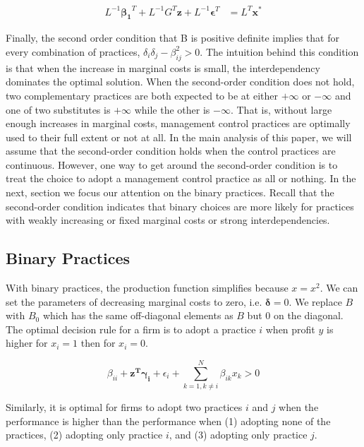 \documentclass[12pt]{article}
\begin{document}
\begin{equation} \label{eq:cholesky}
\begin{aligned} 
    L^{-1} \mathbf{\beta_1}^T + L^{-1} G^T \mathbf{z} + L^{-1} \mathbf{\epsilon}^T & = L^T \mathbf{x^*} 
\end{aligned}
\end{equation}

Finally, the second order condition that B is positive definite implies that for every combination of practices, $\delta_i \delta_j - \beta_{ij}^2 > 0$. The intuition behind this condition is that when the increase in marginal costs is small, the interdependency dominates the optimal solution. When the second-order condition does not hold, two complementary practices are both expected to be at either \(+\infty\) or \(-\infty\) and one of two substitutes is \(+\infty\) while the other is \(-\infty\). That is, without large enough increases in marginal costs, management control practices are optimally used to their full extent or not at all. In the main analysis of this paper, we will assume that the second-order condition holds when the control practices are continuous. However, one way to get around the second-order condition is to treat the choice to adopt a management control practice as all or nothing. In the next, section we focus our attention on the binary practices. Recall that the second-order condition indicates that binary choices are more likely for practices with weakly increasing or fixed marginal costs or strong interdependencies.

\subsection{Binary Practices}

With binary practices, the production function simplifies because $x = x^2$. We can set the parameters of decreasing marginal costs to zero, i.e. $\mathbf{\delta} = 0$. We replace $B$ with $B_0$ which has the same off-diagonal elements as $B$ but $0$ on the diagonal. The optimal decision rule for a firm is to adopt a practice $i$ when profit $y$ is higher for $x_i = 1$ then for $x_i = 0$. 

\begin{equation} \label{eq:condition-binary}
    \beta_{ii} + \mathbf{z^T} \mathbf{\gamma_i} + \epsilon_i 
    + \sum^{N}_{k = 1, k \neq i} \beta_{ik} x_k > 0
\end{equation}

Similarly, it is optimal for firms to adopt two practices $i$ and $j$ when the performance is higher than the performance when (1) adopting none of the practices, (2) adopting only practice $i$, and (3) adopting only practice $j$. 
\end{document}
